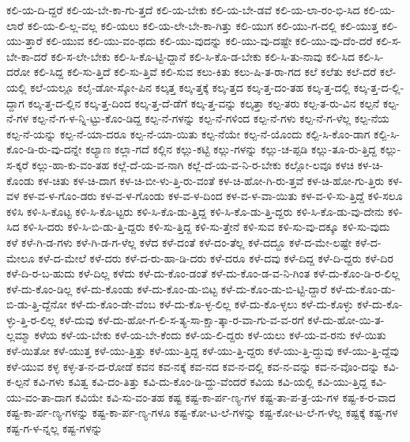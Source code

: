 {ಕಲಿ-ಯ-ದಿ-ದ್ದರೆ
ಕಲಿ-ಯ-ಬೇ-ಕಾ-ಗು-ತ್ತದೆ
ಕಲಿ-ಯ-ಬೇಕು
ಕಲಿ-ಯ-ಬೇ-ಡವೆ
ಕಲಿ-ಯ-ಲಾ-ರಂ-ಭಿ-ಸಿದ
ಕಲಿ-ಯ-ಲಾರೆ
ಕಲಿ-ಯ-ಲಿ-ಲ್ಲ-ವಲ್ಲ
ಕಲಿ-ಯಲು
ಕಲಿ-ಯ-ಲೇ-ಬೇ-ಕಾ-ಗಿತ್ತು
ಕಲಿ-ಯುಗ
ಕಲಿ-ಯು-ಗ-ದಲ್ಲಿ
ಕಲಿ-ಯುತ್ತ
ಕಲಿ-ಯು-ತ್ತಾರೆ
ಕಲಿ-ಯುವ
ಕಲಿ-ಯು-ವಂ-ಥದು
ಕಲಿ-ಯು-ವುದನ್ನು
ಕಲಿ-ಯು-ವು-ದಷ್ಟೇ
ಕಲಿ-ಯು-ವು-ದೆಂ-ದರೆ
ಕಲಿ-ಸ-ಬೇ-ಕಾ-ದರೆ
ಕಲಿ-ಸ-ಲೇ-ಬೇಕು
ಕಲಿ-ಸಿ-ಕೊ-ಟ್ಟಿ-ದ್ದಾನೆ
ಕಲಿ-ಸಿ-ಕೊ-ಡ-ಬೇಕು
ಕಲಿ-ಸಿ-ತು-ನಾವು
ಕಲಿ-ಸಿದ
ಕಲಿ-ಸಿ-ದರೋ
ಕಲಿ-ಸಿದ್ದ
ಕಲಿ-ಸು-ತ್ತಿದೆ
ಕಲಿ-ಸು-ತ್ತಿವೆ
ಕಲಿ-ಸುವ
ಕಲು-ಕಿತು
ಕಲು-ಷಿ-ತ-ರಾ-ಗದ
ಕಲೆ
ಕಲೆತು
ಕಲೆ-ದರೆ
ಕಲೆ-ಯಲ್ಲಿ
ಕಲೆ-ಯಲ್ಲೂ
ಕಲೈ-ಡೋ-ಸ್ಕೋ-ಪಿನ
ಕಲ್ಕತ್ತ
ಕಲ್ಕ-ತ್ತಕ್ಕೆ
ಕಲ್ಕ-ತ್ತದ
ಕಲ್ಕ-ತ್ತ-ದಂ-ತಹ
ಕಲ್ಕ-ತ್ತ-ದಲ್ಲಿ
ಕಲ್ಕ-ತ್ತ-ದ-ಲ್ಲಿ-ದ್ದಾಗ
ಕಲ್ಕ-ತ್ತ-ದ-ಲ್ಲಿನ
ಕಲ್ಕ-ತ್ತ-ದಿಂದ
ಕಲ್ಕ-ತ್ತ-ದೆ-ಡೆಗೆ
ಕಲ್ಕ-ತ್ತ-ವನ್ನು
ಕಲ್ಕತ್ತಾ
ಕಲ್ಪ-ತರು
ಕಲ್ಪ-ತ-ರು-ವಿನ
ಕಲ್ಪನೆ
ಕಲ್ಪ-ನೆ-ಗಳ
ಕಲ್ಪ-ನೆ-ಗ-ಳ-ನ್ನಿ-ಟ್ಟು-ಕೊಂ-ಡಿದ್ದ
ಕಲ್ಪ-ನೆ-ಗಳನ್ನು
ಕಲ್ಪ-ನೆ-ಗಳಿಂದ
ಕಲ್ಪ-ನೆ-ಗಳು
ಕಲ್ಪ-ನೆ-ಗ-ಳೆಲ್ಲ
ಕಲ್ಪ-ನೆಯ
ಕಲ್ಪ-ನೆ-ಯನ್ನು
ಕಲ್ಪ-ನೆ-ಯಾ-ದರೂ
ಕಲ್ಪ-ನೆ-ಯಾ-ಯಿತು
ಕಲ್ಪ-ನೆಯೇ
ಕಲ್ಪ-ನೆ-ಯೊಂದು
ಕಲ್ಪಿ-ಸಿ-ಕೊಂ-ಡಾಗ
ಕಲ್ಪಿ-ಸಿ-ಕೊಂ-ಡಿ-ರು-ವು-ದನ್ನೇ
ಕಲ್ಯಾಣ
ಕಲ್ಲಾ-ಗದೆ
ಕಲ್ಲಿನ
ಕಲ್ಲು-ಕಟ್ಟಿ
ಕಲ್ಲು-ಗಳನ್ನು
ಕಲ್ಲು-ಚ-ಪ್ಪಡಿ
ಕಲ್ಲು-ತೂ-ರು-ತ್ತಿದ್ದ
ಕಲ್ಲು-ಸ-ಕ್ಕರೆ
ಕಲ್ಲು-ಹಾ-ಕು-ವಂ-ತಹ
ಕಲ್ಲೆ-ದೆ-ಯ-ವ-ನಾಗಿ
ಕಲ್ಲೆ-ದೆ-ಯ-ವ-ನಿ-ರ-ಬೇಕು
ಕಲ್ಲೋ-ಲವೂ
ಕಳಚಿ
ಕಳ-ಚಿ-ಕೊಂಡು
ಕಳ-ಚಿತು
ಕಳ-ಚಿ-ದಾಗ
ಕಳ-ಚಿ-ಬೀ-ಳು-ತ್ತಿ-ರು-ವಂತೆ
ಕಳ-ಚಿ-ಹೋ-ಗಿ-ರು-ತ್ತವೆ
ಕಳ-ಚಿ-ಹೋ-ಗು-ತ್ತಿರು
ಕಳ-ವಳ
ಕಳ-ವ-ಳ-ಗೊಂ-ಡರು
ಕಳ-ವ-ಳ-ಗೊಂಡು
ಕಳ-ವ-ಳ-ದಿಂದ
ಕಳ-ವ-ಳ-ವಾ-ಯಿತು
ಕಳ-ವ-ಳಿ-ಸು-ತ್ತಿದ್ದೆ
ಕಳಿ-ಸಲೂ
ಕಳಿಸಿ
ಕಳಿ-ಸಿ-ಕೊಟ್ಟ
ಕಳಿ-ಸಿ-ಕೊ-ಟ್ಟರು
ಕಳಿ-ಸಿ-ಕೊ-ಡು-ತ್ತಿದ್ದ
ಕಳಿ-ಸಿ-ಕೊ-ಡು-ತ್ತಿ-ದ್ದರು
ಕಳಿ-ಸಿ-ಕೊ-ಡು-ವು-ದೇನು
ಕಳಿ-ಸಿದ
ಕಳಿ-ಸಿ-ದರು
ಕಳಿ-ಸಿ-ಬಿ-ಡು-ತ್ತಿ-ದ್ದರು
ಕಳಿ-ಸು-ತ್ತಿದ್ದ
ಕಳಿ-ಸು-ತ್ತೇನೆ
ಕಳಿ-ಸುವ
ಕಳಿ-ಸು-ವು-ದಕ್ಕೂ
ಕಳಿ-ಸು-ವುದು
ಕಳೆ
ಕಳೆ-ಗಿ-ಡ-ಗಳು
ಕಳೆ-ಗಿ-ಡ-ಗ-ಳೆಲ್ಲ
ಕಳೆದ
ಕಳೆ-ದಂತೆ
ಕಳೆ-ದಂ-ತೆಲ್ಲ
ಕಳೆ-ದದ್ದೂ
ಕಳೆ-ದ-ಮೇ-ಲಷ್ಟೇ
ಕಳೆ-ದ-ಮೇಲೂ
ಕಳೆ-ದ-ಮೇಲೆ
ಕಳೆ-ದರು
ಕಳೆ-ದ-ರು-ಹಾ-ಡಿ-ದರು
ಕಳೆ-ದರೂ
ಕಳೆ-ದವು
ಕಳೆ-ದಿದ್ದ
ಕಳೆ-ದಿ-ದ್ದರು
ಕಳೆ-ದಿರ
ಕಳೆ-ದಿ-ರ-ಬ-ಹುದು
ಕಳೆ-ದಿಲ್ಲ
ಕಳೆದು
ಕಳೆ-ದು-ಕೊಂ-ಡಂತೆ
ಕಳೆ-ದು-ಕೊಂ-ಡ-ವ-ನಿ-ಗಿಂತ
ಕಳೆ-ದು-ಕೊಂ-ಡಿ-ರ-ಲಿಲ್ಲ
ಕಳೆ-ದು-ಕೊಂ-ಡಿಲ್ಲ
ಕಳೆ-ದು-ಕೊಂಡು
ಕಳೆ-ದು-ಕೊಂ-ಡು-ಬಿಟ್ಟ
ಕಳೆ-ದು-ಕೊಂ-ಡು-ಬಿ-ಟ್ಟಿ-ದ್ದಾರೆ
ಕಳೆ-ದು-ಕೊಂ-ಡು-ಬಿ-ಡು-ತ್ತಿ-ದ್ದೆನೋ
ಕಳೆ-ದು-ಕೊಂ-ಡೇ-ವೆಂಬ
ಕಳೆ-ದು-ಕೊ-ಳ್ಳ-ಲಿಲ್ಲ
ಕಳೆ-ದು-ಕೊ-ಳ್ಳಲು
ಕಳೆ-ದು-ಕೊಳ್ಳು
ಕಳೆ-ದು-ಕೊ-ಳ್ಳು-ತ್ತಿ-ರ-ಲಿಲ್ಲ
ಕಳೆ-ದುವು
ಕಳೆ-ದು-ಹೋ-ಗ-ಲಿ-ಸ-ತ್ಯ-ಸಾ-ಕ್ಷಾ-ತ್ಕಾ-ರ-ವಾ-ಗು-ವ-ವ-ರಗೆ
ಕಳೆ-ದು-ಹೋ-ಯಿ-ತ-ಲ್ಲಮ್ಮಾ
ಕಳೆಯ
ಕಳೆ-ಯ-ಬೇಕು
ಕಳೆ-ಯ-ಬೇ-ಕೆಂದು
ಕಳೆ-ಯ-ಲಿ-ದ್ದರು
ಕಳೆ-ಯಲು
ಕಳೆ-ಯ-ವ-ರನು
ಕಳೆ-ಯಿತು
ಕಳೆ-ಯಿತೋ
ಕಳೆ-ಯುತ್ತ
ಕಳೆ-ಯು-ತ್ತಿತ್ತು
ಕಳೆ-ಯು-ತ್ತಿದ್ದ
ಕಳೆ-ಯು-ತ್ತಿ-ದ್ದರು
ಕಳೆ-ಯು-ತ್ತಿ-ದ್ದುವು
ಕಳೆ-ಯು-ತ್ತಿ-ದ್ದೆವು
ಕಳೆ-ಯುವ
ಕಳ್ಳ
ಕಳ್ಳ-ತ-ನ-ದ-ರೋಡೆ
ಕವನ
ಕವ-ನಕ್ಕೆ
ಕವ-ನದ
ಕವ-ನ-ದಲ್ಲಿ
ಕವ-ನ-ವನ್ನು
ಕವ-ನ-ವೊಂ-ದನ್ನು
ಕವಿ-ಕ-ಲ್ಪನೆ
ಕವಿ-ಗಳು
ಕವಿತ್ವ
ಕವಿ-ದಂ-ತಿತ್ತು
ಕವಿ-ದು-ಕೊಂ-ಡಿ-ದ್ದು-ವೆಂದರೆ
ಕವಿಯ
ಕವಿ-ಯಲ್ಲಿ
ಕವಿ-ಯು-ತ್ತಿದ್ದ
ಕವಿ-ಯು-ವಂ-ತಾ-ದಾಗ
ಕವಿಯೇ
ಕವಿ-ಸು-ವಂ-ತಹ
ಕಷ್ಟ
ಕಷ್ಟ-ಕಾ-ರ್ಪ-ಣ್ಯ-ಗಳ
ಕಷ್ಟ-ತಾ-ಪ-ತ್ರ-ಯ-ಗಳ
ಕಷ್ಟ-ಕ-ರ-ವಾದ
ಕಷ್ಟ-ಕಾ-ರ್ಪ-ಣ್ಯ-ಗಳನ್ನು
ಕಷ್ಟ-ಕಾ-ರ್ಪ-ಣ್ಯ-ಗಳೂ
ಕಷ್ಟ-ಕೋ-ಟ-ಲೆ-ಗಳನ್ನು
ಕಷ್ಟ-ಕೋ-ಟ-ಲೆ-ಗ-ಳೆಲ್ಲ
ಕಷ್ಟಕ್ಕೆ
ಕಷ್ಟ-ಗಳ
ಕಷ್ಟ-ಗ-ಳ-ನ್ನಲ್ಲ
ಕಷ್ಟ-ಗಳನ್ನು
}
